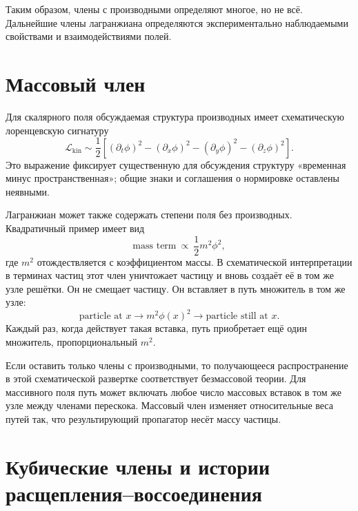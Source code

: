 Таким образом, члены с производными определяют многое, но не всё. Дальнейшие члены лагранжиана определяются экспериментально наблюдаемыми свойствами и взаимодействиями полей.

\section{Массовый член}

Для скалярного поля обсуждаемая структура производных имеет схематическую лоренцевскую сигнатуру
\begin{equation}
\mathcal{L}_{\mathrm{kin}}
\sim
\frac{1}{2}\left[
(\partial_t\phi)^2
-(\partial_x\phi)^2
-(\partial_y\phi)^2
-(\partial_z\phi)^2
\right].
\end{equation}
Это выражение фиксирует существенную для обсуждения структуру «временная минус пространственная»; общие знаки и соглашения о нормировке оставлены неявными.

Лагранжиан может также содержать степени поля без производных. Квадратичный пример имеет вид
\begin{equation}
\text{mass term}\ \propto\ \frac{1}{2}m^2\phi^2,
\end{equation}
где \(m^2\) отождествляется с коэффициентом массы. В схематической интерпретации в терминах частиц этот член уничтожает частицу и вновь создаёт её в том же узле решётки. Он не смещает частицу. Он вставляет в путь множитель в том же узле:
\begin{equation}
\text{particle at }x
\longrightarrow
\boxed{m^2\phi(x)^2}
\longrightarrow
\text{particle still at }x.
\end{equation}
Каждый раз, когда действует такая вставка, путь приобретает ещё один множитель, пропорциональный \(m^2\).

Если оставить только члены с производными, то получающееся распространение в этой схематической развертке соответствует безмассовой теории. Для массивного поля путь может включать любое число массовых вставок в том же узле между членами перескока. Массовый член изменяет относительные веса путей так, что результирующий пропагатор несёт массу частицы.

\section{Кубические члены и истории расщепления--воссоединения}

